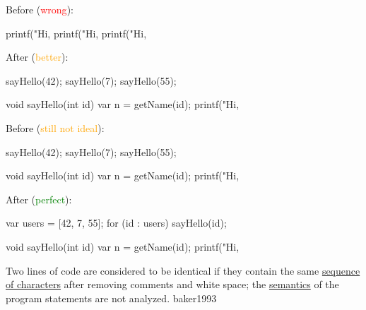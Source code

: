 \documentclass{article}
\begin{document}
\begin{multicols}{2}
Before (\textcolor{red}{wrong}):\par
{\small\begin{ffcode}
printf("Hi, %
printf("Hi, %
printf("Hi, %
\end{ffcode}
}
\par\columnbreak\par
After (\textcolor{orange}{better}):\par
{\small\begin{ffcode}
sayHello(42);
sayHello(7);
sayHello(55);

void sayHello(int id) {
  var n = getName(id);
  printf("Hi, %
}
\end{ffcode}
}
\end{multicols}
\plush{}

\begin{multicols}{2}
Before (\textcolor{orange}{still not ideal}):\par
{\small\begin{ffcode}
sayHello(42);
sayHello(7);
sayHello(55);

void sayHello(int id) {
  var n = getName(id);
  printf("Hi, %
}
\end{ffcode}
}
\par\columnbreak\par
After (\textcolor{green}{perfect}):\par
{\small\begin{ffcode}
var users = [42, 7, 55];
for (id : users) {
  sayHello(id);
}

void sayHello(int id) {
  var n = getName(id);
  printf("Hi, %
}
\end{ffcode}
}
\end{multicols}
\plush{}

  {Two lines of code are considered to be identical if they contain the same \ul{sequence of characters} after removing comments and white space; the \ul{semantics} of the program statements are not analyzed.}
  {baker1993}
\end{document}
